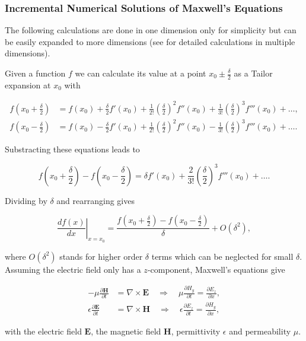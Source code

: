 \subsubsection{Incremental Numerical Solutions of Maxwell's Equations}

The following calculations are done in one dimension only for simplicity but can be easily expanded to more dimensions (see \cite{numel} for detailed calculations in multiple dimensions).

Given a function $f$ we can calculate its value at a point $x_0\pm\frac{\delta}{2}$ as a Tailor expansion at $x_0$ with

\begin{align}
  f\left(x_0+\frac{\delta}{2}\right)&=f(x_0)+\frac{\delta}{2}f'(x_0)+\frac{1}{2!}\left(\frac{\delta}{2}\right)^2f''(x_0)+\frac{1}{3!}\left(\frac{\delta}{2}\right)^3f'''(x_0)+\dots,\\
  f\left(x_0-\frac{\delta}{2}\right)&=f(x_0)-\frac{\delta}{2}f'(x_0)+\frac{1}{2!}\left(\frac{\delta}{2}\right)^2f''(x_0)-\frac{1}{3!}\left(\frac{\delta}{2}\right)^3f'''(x_0)+\dots.
\end{align}

Substracting these equations leads to

\begin{equation}
  f\left(x_0+\frac{\delta}{2}\right)-f\left(x_0-\frac{\delta}{2}\right)=\delta f'(x_0)+\frac{2}{3!}\left(\frac{\delta}{2}\right)^3f'''(x_0)+\dots.
\end{equation}

Dividing by $\delta$ and rearranging gives

\begin{equation}
  \left.\frac{df(x)}{dx}\right|_{x=x_0} = \frac{f(x_0+\frac{\delta}{2})-f(x_0-\frac{\delta}{2})}{\delta} + O(\delta^2),
\end{equation}

where $O(\delta^2)$ stands for higher order $\delta$ terms which can be neglected for small $\delta$. Assuming the electric field only has a $z$-component, Maxwell's equations give

\begin{align}
  -\mu\frac{\partial\mathbf{H}}{\partial t}&=\nabla\times\mathbf{E} \quad\Rightarrow\quad \mu\frac{\partial H_y}{\partial t} = \frac{\partial E_z}{\partial x},\\ \label{eq:maxwell}
  \epsilon\frac{\partial\mathbf{E}}{\partial t}&=\nabla\times\mathbf{H} \quad\Rightarrow\quad \epsilon\frac{\partial E_z}{\partial t} = \frac{\partial H_y}{\partial x},
\end{align}

with the electric field $\mathbf{E}$, the magnetic field $\mathbf{H}$, permittivity $\epsilon$ and permeability $\mu$.
